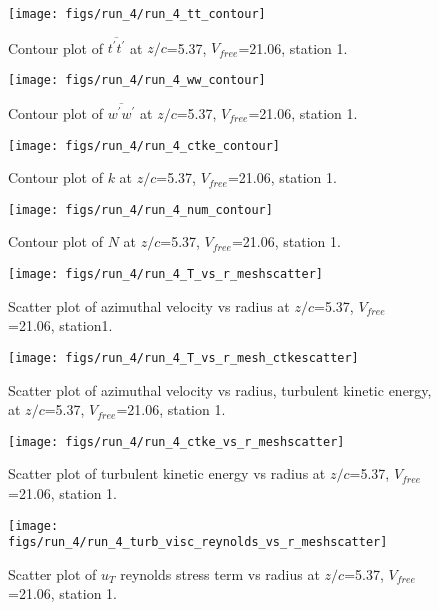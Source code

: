 \begin{figure}[H]
\centering
\texttt{[image: figs/run\_4/run\_4\_tt\_contour]}
\caption{Contour plot of $\overline{t^\prime t^\prime}$ at $z/c$=5.37, $V_{free}$=21.06, station 1.}
\end{figure}


\begin{figure}[H]
\centering
\texttt{[image: figs/run\_4/run\_4\_ww\_contour]}
\caption{Contour plot of $\overline{w^\prime w^\prime}$ at $z/c$=5.37, $V_{free}$=21.06, station 1.}
\end{figure}


\begin{figure}[H]
\centering
\texttt{[image: figs/run\_4/run\_4\_ctke\_contour]}
\caption{Contour plot of $k$ at $z/c$=5.37, $V_{free}$=21.06, station 1.}
\end{figure}


\begin{figure}[H]
\centering
\texttt{[image: figs/run\_4/run\_4\_num\_contour]}
\caption{Contour plot of $N$ at $z/c$=5.37, $V_{free}$=21.06, station 1.}
\end{figure}


\begin{figure}[H]
\centering
\texttt{[image: figs/run\_4/run\_4\_T\_vs\_r\_meshscatter]}
\caption{Scatter plot of azimuthal velocity vs radius at $z/c$=5.37, $V_{free}$=21.06, station1.}
\end{figure}


\begin{figure}[H]
\centering
\texttt{[image: figs/run\_4/run\_4\_T\_vs\_r\_mesh\_ctkescatter]}
\caption{Scatter plot of azimuthal velocity vs radius, turbulent kinetic energy, at $z/c$=5.37, $V_{free}$=21.06, station 1.}
\end{figure}


\begin{figure}[H]
\centering
\texttt{[image: figs/run\_4/run\_4\_ctke\_vs\_r\_meshscatter]}
\caption{Scatter plot of turbulent kinetic energy vs radius at $z/c$=5.37, $V_{free}$=21.06, station 1.}
\end{figure}


\begin{figure}[H]
\centering
\texttt{[image: figs/run\_4/run\_4\_turb\_visc\_reynolds\_vs\_r\_meshscatter]}
\caption{Scatter plot of $
u_T$ reynolds stress term vs radius at $z/c$=5.37, $V_{free}$=21.06, station 1.}
\end{figure}


